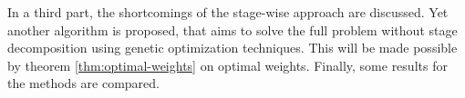 In a third part, the shortcomings of the stage-wise approach are discussed.
Yet another algorithm is proposed, that aims to solve the full problem without stage decomposition using genetic optimization techniques.
This will be made possible by theorem \ref{thm:optimal-weights} on optimal weights.
Finally, some results for the methods are compared.
\begin{comment}
  \subsubsection{The Full MILP Model}
  Suppose we start with a (index) set $I$ of scenarios generated from the original stochastic process by sampling.
  For each node $k$ in the proposed tree structure, we introduce binary variables $z_{ki}$ which are 1 if node $k$ will take on the value of scenario $k$ of scenario $i \in I$ at the corresponding time step $t$, namely $\xi_i^t$.
  Using these variables, problem (\ref{eq:symbolic-optimization-with-minflow2}) can be formulated as the following MILP:
  \begin{eqnarray}
    \label{eq:full-milp-objective}
    &\min\limits_{\eta, q, z}&\sum_{i\in I}\sum_{j\in J}\sum_{t\in T}\eta_{ijt}c(\xi_i^t,\xi_j^t)\\
    \label{eq:full-milp-qsum}
    &\mathrm{s.t.}&\sum_{i\in I}\eta_{ijt} = q_j\\
    \label{eq:full-milp-psum}
    &&\sum_{j\in J}\eta_{ijt} = p_i\\
    \label{eq:full-milp-q-distribution}
    &&q_j = \sum_{k\in \mathrm{children}(j)}q_k\\
    \label{eq:full-milp-tree}
    &&\eta_{ijt} \leq \eta_{i,\mathrm{father}(j),t-1}\\
    \label{eq:full-milp-only-selected}
    &&\eta_{ijt} \leq z_{kj} \\%
    \label{eq:full-milp-contibounds}
    &&0\leq q \leq 1,\;0\leq \eta \leq 1\\
    \label{eq:full-milp-binarybounds}
    &&z\in \left\{0,1\right\}
  \end{eqnarray}
  \todo[inline]{ist das modell wirklich korrekt so? }
  The probability measures $q_{jt}$ and $\eta_{ijt}$ are modeled as probabilities for each scenario $j\in J$ of the tree. 
  Each scenario corresponds to a leaf node.
  Equations (\ref{eq:full-milp-qsum}) and (\ref{eq:full-milp-psum}) represent the requirements on the marginal probabilities of the measure $\eta$ (see (\ref{eq:define-borel-measures})).
  Equation \ref{eq:full-milp-q-distribution} ensures the consistency of the probabilities of the nodes.
  The inequalities \ref{eq:full-milp-tree} are constraints that preserve the filtration of the original scenarios.
  With the inequalities \ref{eq:full-milp-only-selected}, all variables $\eta_{ijt}$ that belong to nodes $j$ that 


\end{comment}
